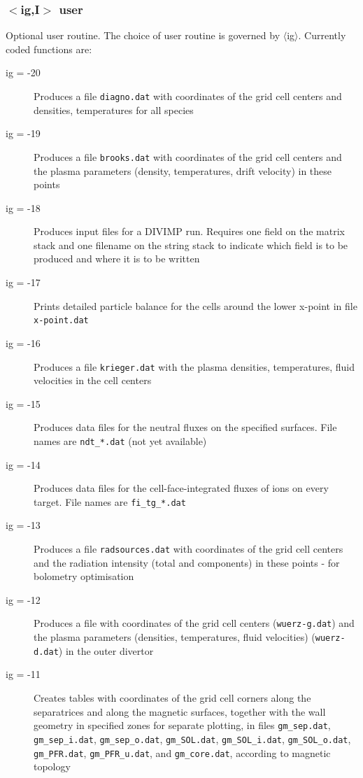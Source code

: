\documentclass[a4paper,10pt]{report}
\begin{document}
\subsubsection{$<$ig,{\bf I}$>$ user}\label{sec:user}
Optional user routine. The choice of user routine is governed by $\langle$ig$\rangle$.
Currently coded functions are:
\begin{description}
  \item[ig = -20] Produces a file {\tt diagno.dat} with coordinates of the grid cell centers and densities, temperatures for all species
  \item[ig = -19] Produces a file {\tt brooks.dat} with coordinates of the grid cell centers and the plasma parameters (density, temperatures, drift velocity) in these points
  \item[ig = -18] Produces input files for a DIVIMP run. Requires one field on the matrix stack and one filename on the string stack to indicate which field is to be produced and where it is to be written
  \item[ig = -17] Prints detailed particle balance for the cells around the lower x-point in file {\tt x-point.dat}
  \item[ig = -16] Produces a file {\tt krieger.dat} with the plasma densities, temperatures, fluid velocities in the cell centers
  \item[ig = -15] Produces data files for the neutral fluxes on the specified surfaces. File names are {\tt ndt\_*.dat} (not yet available)
  \item[ig = -14] Produces data files for the cell-face-integrated fluxes of ions on every target. File names are {\tt fi\_tg\_*.dat}
  \item[ig = -13] Produces a file {\tt radsources.dat} with coordinates of the grid cell centers and the radiation intensity (total and components) in these points - for bolometry optimisation
  \item[ig = -12] Produces a file with coordinates of the grid cell centers ({\tt wuerz-g.dat}) and the plasma parameters (densities, temperatures, fluid velocities) ({\tt wuerz-d.dat}) in the outer divertor
  \item[ig = -11] Creates tables with coordinates of the grid cell corners along the separatrices and along the magnetic surfaces, together with the wall geometry in specified zones for separate plotting, in files {\tt gm\_sep.dat}, {\tt gm\_sep\_i.dat}, {\tt gm\_sep\_o.dat}, {\tt gm\_SOL.dat}, {\tt gm\_SOL\_i.dat}, {\tt gm\_SOL\_o.dat}, {\tt gm\_PFR.dat}, {\tt gm\_PFR\_u.dat}, and {\tt gm\_core.dat}, according to magnetic topology

\end{description}
\end{document}
